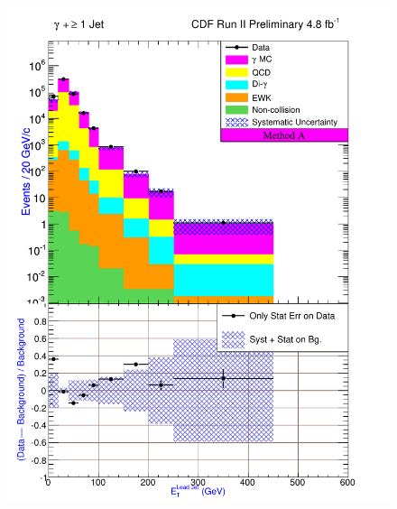 \documentclass[12pt,twoside,letterpaper,doublespace]{article}
\begin{document}
\begin{figure}[h!]
{\includegraphics[keepaspectratio=true, scale=\figScale]{G30Jets_MtdA_plot1_Et_j1.pdf}
}


\end{figure}
\end{document}
